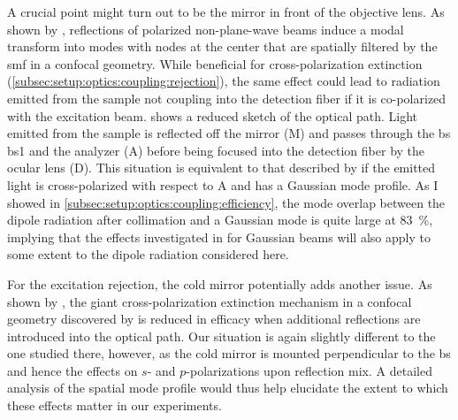 A crucial point might turn out to be the mirror in front of the objective lens.
As shown by \citet{Benelajla2021}, reflections of polarized non-plane-wave beams induce a modal transform into modes with nodes at the center that are spatially filtered by the \gls{smf} in a confocal geometry.
While beneficial for cross-polarization extinction (\cf \cref{subsec:setup:optics:coupling:rejection}), the same effect could lead to radiation emitted from the sample not coupling into the detection fiber if it is co-polarized with the excitation beam.
 shows a reduced sketch of the optical path.
Light emitted from the sample is reflected off the mirror (M) and passes through the \acrlong{bs} \acrshort{bs}1 and the analyzer (A) before being focused into the detection fiber by the ocular lens (D).
This situation is equivalent to that described by \citet{Benelajla2021} if the emitted light is cross-polarized with respect to A and has a Gaussian mode profile.
As I showed in \cref{subsec:setup:optics:coupling:efficiency}, the mode overlap between the dipole radiation after collimation and a Gaussian  mode is quite large at \qty{83}{\percent}, implying that the effects investigated in  for Gaussian beams will also apply to some extent to the dipole radiation considered here.

For the excitation rejection, the cold mirror potentially adds another issue.
As shown by \citet{Steindl2023}, the giant cross-polarization extinction mechanism in a confocal geometry discovered by \citet{Benelajla2021} is reduced in efficacy when additional reflections are introduced into the optical path.
Our situation is again slightly different to the one studied there, however, as the cold mirror is mounted perpendicular to the \gls{bs}
and hence the effects on $s$- and $p$-polarizations upon reflection mix.
A detailed analysis of the spatial mode profile would thus help elucidate the extent to which these effects matter in our experiments.

